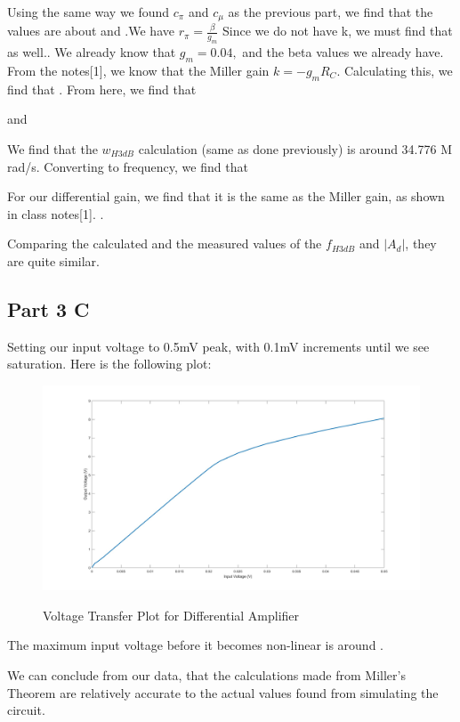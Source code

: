 \documentclass[12pt]{article}
\begin{document}
Using the same way we found $c_\pi$ and $c_\mu$ as the previous part, we find that the values are about  and .We have $r_\pi =\frac{\beta}{g_m}$
Since we do not have k, we must find that as well.. We already know that $g_m=0.04,$
and the beta values we already have. From the notes[1], we know that the Miller gain $k=-g_mR_C$. Calculating this, we find that . From here, we find that 

\begin{center}
 and
\end{center}

We find that the $w_{H3dB}$ calculation (same as done previously) is around 34.776 M rad/s. Converting to frequency, we find that 

For our differential gain, we find that it is the same as the Miller gain, as shown in class notes[1]. .

Comparing the calculated and the measured values of the $f_{H3dB}$ and $|A_d|$, they are quite similar. 

\subsection{Part 3 C}

Setting our input voltage to 0.5mV peak, with 0.1mV increments until we see saturation. Here is the following plot:


\begin{figure}[h!]
\centering
\includegraphics[height=0.32\textwidth]{Images/part_3_voltage_tf.jpg}\\
\caption{Voltage Transfer Plot for Differential Amplifier}
\label{fig:cascadeamp}
\end{figure}
\FloatBarrier

The maximum input voltage before it becomes non-linear is around .

We can conclude from our data, that the calculations made from Miller's Theorem are relatively accurate to the actual values found from simulating the circuit.
\end{document}

